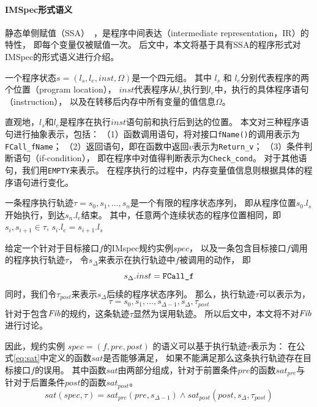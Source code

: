 \paragraph{IMSpec形式语义}
静态单侧赋值（SSA）~\cite{ssa}，是程序中间表达（intermediate representation，IR）的特性，
即每个变量仅被赋值一次。
后文中，本文将基于具有SSA的程序形式对IMSpec的形式语义进行介绍。

\begin{definition}[程序状态]
	一个程序状态$s = (l_s, l_e, inst, \Omega)$是一个四元组。
	其中 $l_s$ 和 $l_e$分别代表程序的两个位置（program location）， 
	$inst$代表程序从$l_s$执行到$l_e$中，执行的具体程序语句（instruction），
	以及在转移后内存中所有变量的值信息$\Omega$。
\end{definition}

直观地，$l_s$和$l_e$是程序在执行$inst$语句前和执行后到达的位置。
本文对三种程序语句进行抽象表示，包括：
（1）函数调用语句，将对接口\texttt{fName()}的调用表示为\texttt{FCall\_fName}；
（2）返回语句，即在函数中返回$v$表示为\texttt{Return\_v}；
（3）条件判断语句（if-condition），
即在程序中对值得判断表示为\texttt{Check\_cond}。
对于其他语句，我们用\texttt{EMPTY}来表示。
在程序执行的过程中，内存变量值信息则根据具体的程序语句进行变化。

\begin{definition}[执行轨迹]
	一条程序执行轨迹$\tau = s_0, s_1, \dots, s_n$是一个有限的程序状态序列，
	即从程序位置$s_0.l_s$开始执行，到达$s_n.l_e$结束。
	其中，任意两个连续状态的程序位置相同，即$s_i, s_{i+1} \in \tau$, $s_i.l_e = s_{i+1}.l_s$
\end{definition}

给定一个针对于目标接口$f$的IMspec规约实例$\mathit{spec}$，
以及一条包含目标接口$f$调用的程序执行轨迹$\tau$，
令$s_{\Delta}$来表示在执行轨迹中$f$被调用的动作，
即$$s_{\Delta}.inst = \text{\texttt{FCall\_f}}$$
同时，我们令$\tau_{post}$来表示$s_{\Delta}$后续的程序状态序列。
那么，执行轨迹$\tau$可以表示为，
$$\tau = s_0, s_1, \dots, s_{\Delta-1}, s_{\Delta}, \tau_{post}$$
针对于包含$\mathit{Fib}$的规约，这条轨迹$\tau$显然为误用轨迹。
所以后文中，本文将不对$\mathit{Fib}$进行讨论。

因此，规约实例
$\mathit{spec} = (f, \mathit{pre}, \mathit{post})$
的语义可以基于执行轨迹$\tau$表示为：
在公式\ref{eq:sat}中定义的函数$sat$是否能够满足，
如果不能满足那么这条执行轨迹存在目标接口$f$的误用。
其中函数$sat$由两部分组成，针对于前置条件$\mathit{pre}$的函数$sat_{pre}$与
针对于后置条件$\mathit{post}$的函数$sat_{post}$。
\begin{equation}
\label{eq:sat}
sat(\textit{spec}, \tau) = 
sat_{pre}(\mathit{pre},
s_{\Delta-1}) \wedge sat_{post}(\mathit{post},s_{\Delta},\tau_{post})
\end{equation}

